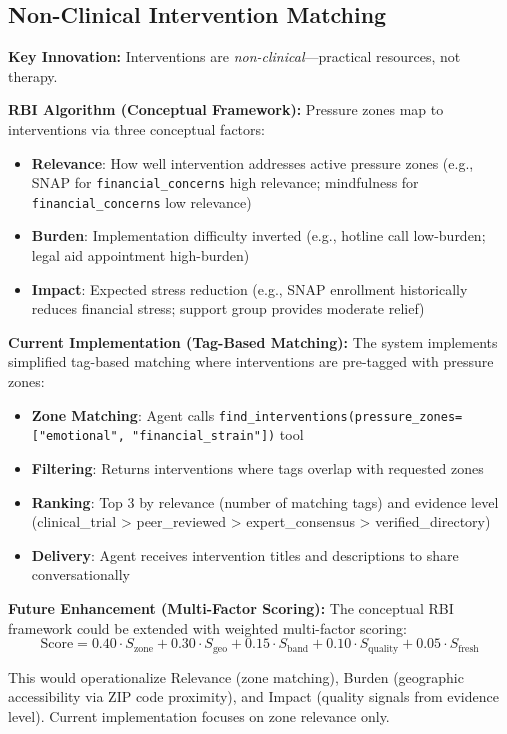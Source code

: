 \documentclass{article}
\begin{document}
%
\subsection{Non{-}Clinical Intervention Matching}%
\label{subsec:Non{-}ClinicalInterventionMatching}%
\textbf{Key Innovation:} Interventions are \textit{non-clinical}—practical resources, not therapy.

\textbf{RBI Algorithm (Conceptual Framework):} Pressure zones map to interventions via three conceptual factors:
\begin{itemize}
    \item \textbf{Relevance}: How well intervention addresses active pressure zones (e.g., SNAP for \texttt{financial\_concerns} high relevance; mindfulness for \texttt{financial\_concerns} low relevance)
    \item \textbf{Burden}: Implementation difficulty inverted (e.g., hotline call low-burden; legal aid appointment high-burden)
    \item \textbf{Impact}: Expected stress reduction (e.g., SNAP enrollment historically reduces financial stress; support group provides moderate relief)
\end{itemize}

\textbf{Current Implementation (Tag-Based Matching):} The system implements simplified tag-based matching where interventions are pre-tagged with pressure zones:
\begin{itemize}
    \item \textbf{Zone Matching}: Agent calls \texttt{find\_interventions(pressure\_zones=["emotional", "financial\_strain"])} tool
    \item \textbf{Filtering}: Returns interventions where tags overlap with requested zones
    \item \textbf{Ranking}: Top 3 by relevance (number of matching tags) and evidence level (clinical\_trial > peer\_reviewed > expert\_consensus > verified\_directory)
    \item \textbf{Delivery}: Agent receives intervention titles and descriptions to share conversationally
\end{itemize}

\textbf{Future Enhancement (Multi-Factor Scoring):} The conceptual RBI framework could be extended with weighted multi-factor scoring:
$$\text{Score} = 0.40 \cdot S_{\text{zone}} + 0.30 \cdot S_{\text{geo}} + 0.15 \cdot S_{\text{band}} + 0.10 \cdot S_{\text{quality}} + 0.05 \cdot S_{\text{fresh}}$$

This would operationalize Relevance (zone matching), Burden (geographic accessibility via ZIP code proximity), and Impact (quality signals from evidence level). Current implementation focuses on zone relevance only.
\end{document}
